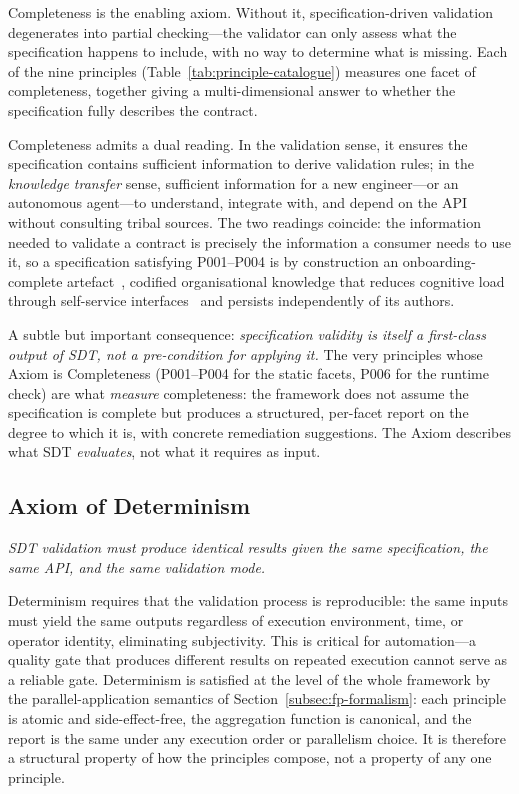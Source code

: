 Completeness is the enabling axiom. Without it, specification-driven validation degenerates into partial checking---the validator can only assess what the specification happens to include, with no way to determine what is missing. Each of the nine principles (Table~\ref{tab:principle-catalogue}) measures one facet of completeness, together giving a multi-dimensional answer to whether the specification fully describes the contract.

Completeness admits a dual reading. In the validation sense, it ensures the specification contains sufficient information to derive validation rules; in the \textit{knowledge transfer} sense, sufficient information for a new engineer---or an autonomous agent---to understand, integrate with, and depend on the API without consulting tribal sources. The two readings coincide: the information needed to validate a contract is precisely the information a consumer needs to use it, so a specification satisfying P001--P004 is by construction an onboarding-complete artefact~\cite{nonaka-knowledge}, codified organisational knowledge that reduces cognitive load through self-service interfaces~\cite{team-topologies} and persists independently of its authors.

A subtle but important consequence: \textit{specification validity is itself a first-class output of SDT, not a pre-condition for applying it.} The very principles whose Axiom is Completeness (P001--P004 for the static facets, P006 for the runtime check) are what \emph{measure} completeness: the framework does not assume the specification is complete but produces a structured, per-facet report on the degree to which it is, with concrete remediation suggestions. The Axiom describes what SDT \emph{evaluates}, not what it requires as input.

\subsection{Axiom of Determinism}
\label{subsec:axiom-determinism}

\textit{SDT validation must produce identical results given the same specification, the same API, and the same validation mode.}

Determinism requires that the validation process is reproducible: the same inputs must yield the same outputs regardless of execution environment, time, or operator identity, eliminating subjectivity. This is critical for automation---a quality gate that produces different results on repeated execution cannot serve as a reliable gate. Determinism is satisfied at the level of the whole framework by the parallel-application semantics of Section~\ref{subsec:fp-formalism}: each principle is atomic and side-effect-free, the aggregation function is canonical, and the report is the same under any execution order or parallelism choice. It is therefore a structural property of how the principles compose, not a property of any one principle.

